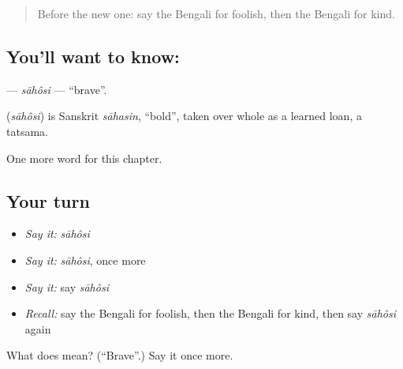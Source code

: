 \begin{quote}
Before the new one: say the Bengali for foolish, then the Bengali for kind.
\end{quote}

\subsection*{You'll want to know: }
\textbf{} — \emph{sāhôsi} — \textquotedblleft{}brave\textquotedblright{}.

\begin{cousinweb}
\textbf{} (\emph{sāhôsi}) is Sanskrit \emph{sāhasin}, \textquotedblleft{}bold\textquotedblright{}, taken over whole as a learned loan, a tatsama.
\end{cousinweb}

\begin{grammarlens}[title={What you've built}]
One more word for this chapter.
\end{grammarlens}

\subsection*{Your turn}
\begin{itemize}
\raggedright
  \item \emph{Say it:} \emph{sāhôsi}
  \item \emph{Say it:} \emph{sāhôsi}, once more
  \item \emph{Say it:} say \emph{sāhôsi}
  \item \emph{Recall:} say the Bengali for foolish, then the Bengali for kind, then say \emph{sāhôsi} again
\end{itemize}

\begin{tcolorbox}[breakable,colback=teal!4,colframe=teal!35!black,title={Before you move on}]
What does  mean? (\textquotedblleft{}Brave\textquotedblright{}.) Say it once more.
\end{tcolorbox}
